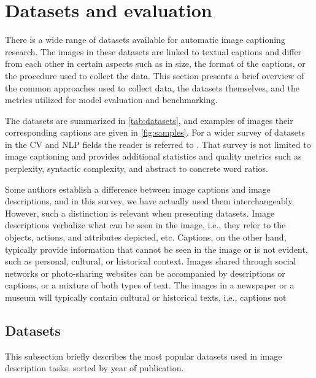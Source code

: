
\section{Datasets and evaluation}\label{sec:evaluation}

There is a wide range of datasets available for automatic image captioning research. The images in these datasets are linked to textual captions and differ from each other in certain aspects such as in size, the format of the captions, or the procedure used to collect the data. This section presents a brief overview of the common approaches used to collect data, the datasets themselves, and the metrics utilized for model evaluation and benchmarking.

The datasets are summarized in \cref{tab:datasets}, and examples of images their corresponding captions are given in \cref{fig:samples}. For a wider survey of datasets in the CV and NLP fields the reader is referred to \citet{Ferraro2015}. That survey is not limited to image captioning and provides additional statistics and quality metrics such as perplexity, syntactic complexity, and abstract to concrete word ratios.

Some authors establish a difference between image captions and image descriptions, and in this survey, we have actually used them interchangeably. However, such a distinction is relevant when presenting datasets. Image descriptions verbalize what can be seen in the image, i.e., they refer to the objects, actions, and attributes depicted, etc. Captions, on the other hand, typically provide information that cannot be seen in the image or is not evident, such as personal, cultural, or historical context. Images shared through social networks or photo-sharing websites can be accompanied by descriptions or captions, or a mixture of both types of text. The images in a newspaper or a museum will typically contain cultural or historical texts, i.e., captions not 

\subsection{Datasets}\label{subsec:datasets}

This subsection briefly describes the most popular datasets used in image description tasks, sorted by year of publication.

